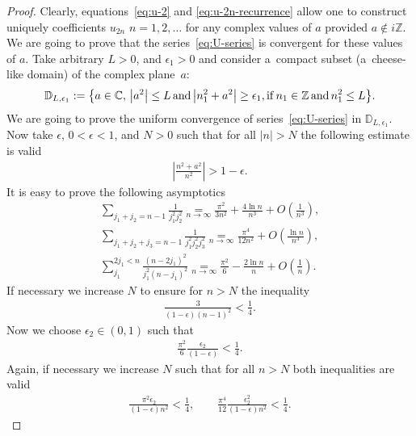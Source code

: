 \documentclass[pdftex]{sigma}
\numberwithin{equation}{section}
\begin{document}
\begin{proof}
Clearly, equations~\eqref{eq:u-2} and \eqref{eq:u-2n-recurrence} allow one to construct uniquely coefficients $u_{2n}$ $n=1,2,\ldots$
for any complex values of $a$ provided $a\notin i\mathbb Z$. We are going to prove that the series~\eqref{eq:U-series} is convergent
for these values of $a$. Take arbitrary $L>0$, and $\epsilon_1>0$ and consider a~compact subset (a~cheese-like domain) of
the complex plane~$a$:
\begin{gather*}
\mathbb{D}_{L,\epsilon_1}:=
\big\{a\in\mathbb{C},\, \big|a^2\big|\leq L \, {\rm and} \, \big|n_1^2+a^2\big|\geq\epsilon_1, {\rm if} \, n_1\in\mathbb{Z}\, {\rm and} \, n_1^2\leq L\big\}.
\end{gather*}
We are going to prove the uniform convergence of series~\eqref{eq:U-series} in $\mathbb{D}_{L,\epsilon_1}$.
Now take $\epsilon$, $0<\epsilon<1$, and $N>0$ such that for all $|n|>N$ the following estimate is valid
\begin{gather*}
\left|\frac{n^2+a^2}{n^2}\right|>1-\epsilon.
\end{gather*}
It is easy to prove the following asymptotics
\begin{gather}
\sum\limits_{j_1+j_2=n-1}\frac1{j_1^2 j_2^2} \underset{n\to\infty}{=}\frac{\pi^2}{3 n^2}+\frac{4\ln n}{n^3}+O\left(\frac{1}{n^3}\right),\nonumber\\
\sum\limits_{j_1+j_2+j_3=n-1}\frac1{j_1^2 j_2^2 j_3^2} \underset{n\to\infty}{=}\frac{\pi^4}{12 n^2}+O\left(\frac{\ln n}{n^3}\right),\nonumber\\
\sum\limits_{j_1}^{2j_1<n}\frac{(n-2j_1)^2}{j_1^2(n-j_1)^2} \underset{n\to\infty}{=} \frac{\pi^2}{6}-\frac{2\ln n}{n}+O\left(\frac{1}{n}\right).\label{eqs:sums-asymptotics}
\end{gather}
If necessary we increase $N$ to ensure for $n>N$ the inequality
\begin{gather}\label{ineq:2choice-N}
\frac{3}{(1-\epsilon)(n-1)^2}<\frac14.
\end{gather}
Now we choose $\epsilon_2\in(0,1)$ such that
\begin{gather}\label{ineq:epsilon2}
\frac{\pi^2}{6}\frac{\epsilon_2}{(1-\epsilon)}<\frac14.
\end{gather}
Again, if necessary we increase $N$ such that for all $n>N$ both inequalities are valid
\begin{gather}\label{ineq:3choice-N}
\frac{\pi^2\epsilon_2}{(1-\epsilon)n^2}<\frac14,\qquad \frac{\pi^4}{12}\frac{\epsilon_2^2}{(1-\epsilon)n^2}<\frac14.
\end{gather}

\end{proof}
\end{document}

